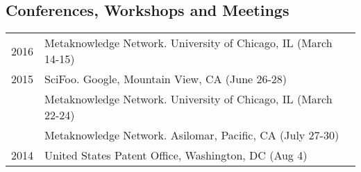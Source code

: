 \documentclass[11pt]{article}
\begin{document}
\subsection*{\textbf{Conferences, Workshops and Meetings}}
\begin{longtable}{p{0.5in}|p{5.5in}}	
  2016 	& Metaknowledge Network. University of Chicago, IL (March 14-15) \\
  2015 	& SciFoo. Google, Mountain View, CA (June 26-28) \\ 
  		& Metaknowledge Network. University of Chicago, IL (March 22-24) \\
  		& Metaknowledge Network. Asilomar, Pacific, CA (July 27-30) \\
  2014 	& United States Patent Office, Washington, DC (Aug 4) \\
\end{longtable}







\end{document}
